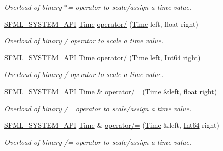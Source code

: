 \begin{DoxyCompactItemize}
\begin{DoxyCompactList}\small\item\em Overload of binary $\ast$= operator to scale/assign a time value. \end{DoxyCompactList}\item 
\hyperlink{sfml_2dep_2_s_f_m_l-2_84_82_2include_2_s_f_m_l_2_system_2_export_8hpp_a6476c9e422606477a4c23d92b1d79a1f}{S\-F\-M\-L\-\_\-\-S\-Y\-S\-T\-E\-M\-\_\-\-A\-P\-I} \hyperlink{classsf_1_1_time}{Time} \hyperlink{classsf_1_1_time_a3386c392dbc62e51dfa59730854d1ed2}{operator/} (\hyperlink{classsf_1_1_time}{Time} left, float right)
\begin{DoxyCompactList}\small\item\em Overload of binary / operator to scale a time value. \end{DoxyCompactList}\item 
\hyperlink{sfml_2dep_2_s_f_m_l-2_84_82_2include_2_s_f_m_l_2_system_2_export_8hpp_a6476c9e422606477a4c23d92b1d79a1f}{S\-F\-M\-L\-\_\-\-S\-Y\-S\-T\-E\-M\-\_\-\-A\-P\-I} \hyperlink{classsf_1_1_time}{Time} \hyperlink{classsf_1_1_time_ab72f2de3e2bb592b4b4008dc1ac79056}{operator/} (\hyperlink{classsf_1_1_time}{Time} left, \hyperlink{namespacesf_a2840579fed3494d9f330baf7a5a19903}{Int64} right)
\begin{DoxyCompactList}\small\item\em Overload of binary / operator to scale a time value. \end{DoxyCompactList}\item 
\hyperlink{sfml_2dep_2_s_f_m_l-2_84_82_2include_2_s_f_m_l_2_system_2_export_8hpp_a6476c9e422606477a4c23d92b1d79a1f}{S\-F\-M\-L\-\_\-\-S\-Y\-S\-T\-E\-M\-\_\-\-A\-P\-I} \hyperlink{classsf_1_1_time}{Time} \& \hyperlink{classsf_1_1_time_a9835490c54cab06492ec3aa9e9275ef9}{operator/=} (\hyperlink{classsf_1_1_time}{Time} \&left, float right)
\begin{DoxyCompactList}\small\item\em Overload of binary /= operator to scale/assign a time value. \end{DoxyCompactList}\item 
\hyperlink{sfml_2dep_2_s_f_m_l-2_84_82_2include_2_s_f_m_l_2_system_2_export_8hpp_a6476c9e422606477a4c23d92b1d79a1f}{S\-F\-M\-L\-\_\-\-S\-Y\-S\-T\-E\-M\-\_\-\-A\-P\-I} \hyperlink{classsf_1_1_time}{Time} \& \hyperlink{classsf_1_1_time_ad51871e3db77def834ae8688e64504ff}{operator/=} (\hyperlink{classsf_1_1_time}{Time} \&left, \hyperlink{namespacesf_a2840579fed3494d9f330baf7a5a19903}{Int64} right)
\begin{DoxyCompactList}\small\item\em Overload of binary /= operator to scale/assign a time value. \end{DoxyCompactList}\item 

\end{DoxyCompactItemize}
